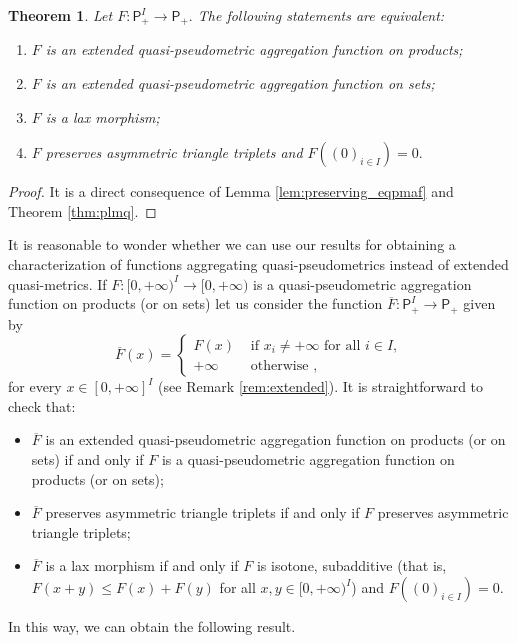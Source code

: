 \documentclass[11pt,a4paper]{amsart}
\newtheorem{theorem}{Theorem}[section]
\theoremstyle{definition}
\begin{document}
	\begin{theorem}\label{thm:eqpmaf}
		Let $F:\mathsf{P}_+^I\to\mathsf{P}_+.$ The following statements are equivalent:
		\begin{enumerate}[(1)]
			\item $F$ is an extended quasi-pseudometric aggregation function on products;
			\item $F$ is an extended quasi-pseudometric aggregation function on sets;
			\item $F$ is a lax morphism;
			\item $F$ preserves asymmetric triangle triplets and $F((0)_{i\in I})=0.$
		\end{enumerate}
	\end{theorem}
	
	
	\begin{proof}
		It is a direct consequence of Lemma \ref{lem:preserving_eqpmaf} and Theorem \ref{thm:plmq}.    
	\end{proof}
	
	
	It is reasonable to wonder whether we can use our results for obtaining a characterization of functions aggregating quasi-pseudometrics instead of extended quasi-metrics. If $F:[0,+\infty)^I\to [0,+\infty)$ is a quasi-pseudometric aggregation function on products (or on sets) let us consider the function $\overline{F}:\mathsf{P}_+^I\to \mathsf{P}_+$ given by
	$$\overline{F}(x)=\begin{cases}
		F(x)&\text{ if }x_i\neq +\infty\text{ for all }i\in I,\\
		+\infty&\text{ otherwise },
	\end{cases}$$
	for every $x\in [0,+\infty]^I$ (see Remark \ref{rem:extended}). It is straightforward to check that:
	\begin{itemize}
		\item $\overline{F}$  is an extended quasi-pseudometric aggregation function on products (or on sets) if and only if $F$ is a quasi-pseudometric aggregation function on products (or on sets);
		\item $\overline{F}$  preserves asymmetric triangle triplets if and only if $F$ preserves asymmetric triangle triplets;
		\item $\overline{F}$ is a lax morphism if and only if $F$ is isotone, subadditive (that is, $F(x+y)\leq F(x)+F(y)$ for all $x,y\in [0,+\infty)^I$) and $F((0)_{i\in I})=0.$
	\end{itemize}
	
	In this way, we can obtain the following result. 
	
\end{document}
